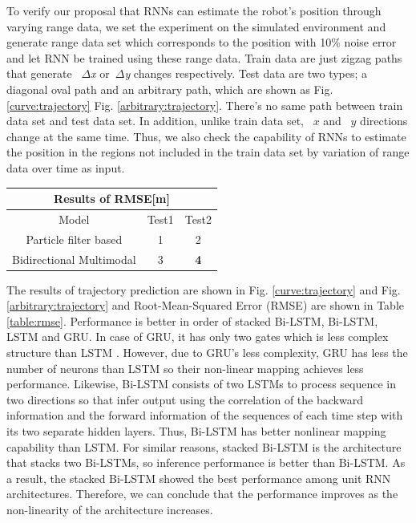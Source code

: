 \documentclass[letterpaper, 10 pt, conference]{ieeeconf}  %
\begin{document}
To verify our proposal that RNNs can estimate the robot's position through varying range data, we set the experiment on the simulated environment and generate range data set which corresponds to the position with 10\% noise error and let RNN be trained using these range data. Train data are just zigzag paths that generate ~\textit{$\Delta$x} or~\textit{$\Delta$y} changes respectively. Test data are two types; a diagonal oval path and an arbitrary path, which are shown as Fig. \ref{curve:trajectory} Fig. \ref{arbitrary:trajectory}. There's no same path between train data set and test data set. In addition, unlike train data set, ~\textit{$x$} and ~\textit{$y$} directions change at the same time. Thus, we also check the capability of RNNs to estimate the position in the regions not included in the train data set by variation of range data over time as input.


 
\begin{table}[h]
	\centering
	\begin{tabular}{cclcl}
		\hline
		\multicolumn{5}{c}{Results of RMSE{[}m{]}}                                                                  \\ \hline
		\multicolumn{1}{c|}{Model}                    & \multicolumn{2}{c|}{Test1} & \multicolumn{2}{c}{Test2}      \\ \hline
		\multicolumn{1}{c|}{Particle filter based}    & \multicolumn{2}{c|}{1}     & \multicolumn{2}{c}{2}          \\
		\multicolumn{1}{c|}{Bidirectional Multimodal} & \multicolumn{2}{c|}{3}     & \multicolumn{2}{c}{\textbf{4}}
	\end{tabular}
	\label{table_rmse}
\end{table}

The results of trajectory prediction are shown in Fig. \ref{curve:trajectory} and Fig. \ref{arbitrary:trajectory} and Root-Mean-Squared Error (RMSE) are shown in Table \ref{table:rmse}. Performance is better in order of stacked Bi-LSTM, Bi-LSTM, LSTM and GRU. In case of GRU, it has only two gates which is less complex structure than LSTM \cite{chung2014empirical}. However, due to GRU's less complexity, GRU has less the number of neurons than LSTM so their non-linear mapping achieves less performance. Likewise, Bi-LSTM consists of two LSTMs to process sequence in two directions so that infer output using the correlation of the backward information and the forward information of the sequences of each time step with its two separate hidden layers. Thus, Bi-LSTM has better nonlinear mapping capability than LSTM. For similar reasons, stacked Bi-LSTM is the architecture that stacks two Bi-LSTMs, so inference performance is better than Bi-LSTM. As a result, the stacked Bi-LSTM showed the best performance among unit RNN architectures. Therefore, we can conclude that the performance improves as the non-linearity of the architecture increases.
\end{document}
